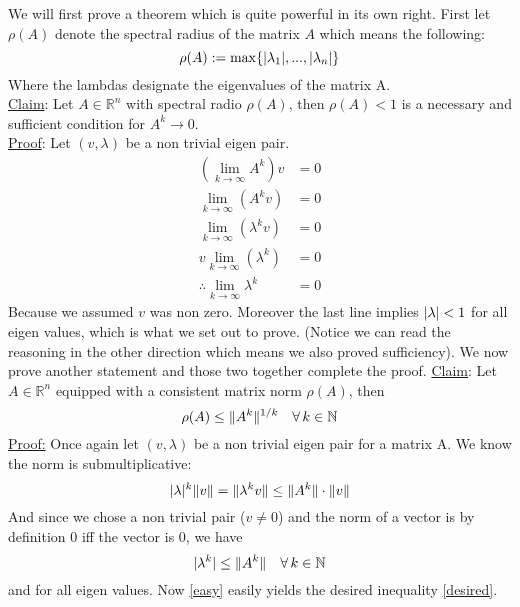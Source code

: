 \documentclass{article}
\DeclarePairedDelimiter{\abs}{\lvert}{\rvert}
\DeclarePairedDelimiter{\norm}{\lVert}{\rVert}
\begin{document}
	We will first prove a theorem which is quite powerful in its own right. First let $\rho(A) $ denote the spectral radius of the matrix $A$ which means the following:
	\begin{equation}
		\rho (A) := \max \{\abs{\lambda_1},...,\abs{\lambda_n} \} 
	\end{equation}
	Where the lambdas designate the eigenvalues of the matrix A. \\
	\underline{Claim}: Let $A\in \mathbb R ^n$ with spectral radio $\rho(A)$, then $\rho(A) < 1$ is a necessary and sufficient condition for $A^k \rightarrow 0$. \\
	\underline{Proof}: Let $(v, \lambda)$ be a non trivial eigen pair.
	\begin{align*}
		\left(\lim\limits_{k\rightarrow \infty } A^k \right) v &= 0\\
		 \lim\limits_{k\rightarrow \infty} (A^k v) &= 0\\
		 \lim\limits_{k \rightarrow \infty} (\lambda^k v) &= 0\\
		 v\lim\limits_{k\rightarrow \infty} (\lambda^k) &= 0\\
		 \therefore \lim\limits_{k \rightarrow \infty} \lambda^k &=0
	\end{align*}
	Because we assumed $v$ was non zero. Moreover the last line implies $\abs \lambda < 1$ for all eigen values, which is what we set out to prove. (Notice we can read the reasoning in the other direction which means we also proved sufficiency).
	\clearpage
	We now prove another statement and those two together complete the proof.
	\underline{Claim}: Let $A\in \mathbb R^n $ equipped with a consistent matrix norm $\rho(A) $, then 
	\begin{equation}\label{desired}
		\rho(A) \leq \norm{A^k}^{1/k} \quad \forall \, k \in \mathbb N
	\end{equation}
	\underline{Proof:} Once again let $(v,\lambda)$ be a non trivial eigen pair for a matrix A. We know the norm is submultiplicative:
	\begin{equation}
		\abs \lambda ^k \norm v = \norm{\lambda ^k v} \leq \norm{A^k} \cdot \norm v 
	\end{equation}
	And since we chose a non trivial pair ($v \neq 0$) and the norm of a vector is by definition 0 iff the vector is 0, we have
	\begin{equation}\label{easy}
		\abs{\lambda ^k} \leq \norm{A^k} \quad \forall \, k\in \mathbb N 
	\end{equation}
	and for all eigen values. Now \ref{easy} easily yields the desired inequality \ref{desired}.
	
\end{document}
